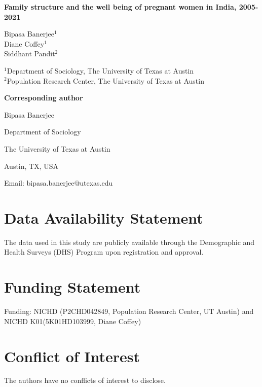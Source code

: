 \documentclass[12pt]{article}
\begin{document}
\begin{center}

{\Large\bfseries Family structure and the well being of pregnant women in India, 2005-2021}

\vspace{1cm}

{\large
Bipasa Banerjee$^{1}$\\[0.4cm]
Diane Coffey$^{1}$\\[0.4cm]
Siddhant Pandit$^{2}$
}

\vspace{0.8cm}

$^{1}$Department of Sociology, The University of Texas at Austin\\
$^{2}$Population Research Center, The University of Texas at Austin

\vspace{0.8cm}

\textbf{Corresponding author}

Bipasa Banerjee

Department of Sociology

The University of Texas at Austin

Austin, TX, USA

Email: bipasa.banerjee@utexas.edu

\end{center}

\vspace{1cm}

\section*{Data Availability Statement}

The data used in this study are publicly available through the Demographic and Health Surveys (DHS) Program upon registration and approval.

\section*{Funding Statement}

Funding: NICHD (P2CHD042849, Population Research Center, UT Austin) and NICHD K01(5K01HD103999, Diane Coffey)


\section*{Conflict of Interest}

The authors have no conflicts of interest to disclose.
\end{document}
